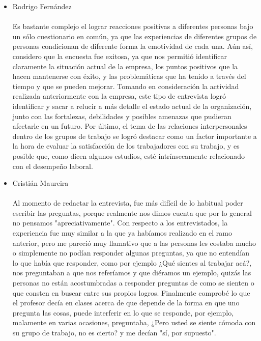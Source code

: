 
\begin{itemize}
	\item Rodrigo Fernández\\ \\
        Es bastante complejo el lograr reacciones positivas a diferentes
        personas bajo un sólo cuestionario en común, ya que las experiencias de
        diferentes grupos de personas condicionan de diferente forma la
        emotividad de cada una. Aún así, considero que la encuesta fue exitosa, ya
        que nos permitió identificar claramente la situación actual de la
        empresa, los puntos positivos que la hacen mantenerse con éxito, y las
        problemáticas que ha tenido a través del tiempo y que se pueden mejorar.
        Tomando en consideración la actividad realizada anteriormente con la
        empresa, este tipo de entrevista logró identificar y sacar a relucir a
        más detalle el estado actual de la organización, junto con las
        fortalezas, debilidades y posibles amenazas que pudieran afectarle en
        un futuro.
        Por último, el tema de las relaciones interpersonales dentro de los
        grupos de trabajo se logró destacar como un factor importante a la
        hora de evaluar la satisfacción de los trabajadores con su trabajo, y
        es posible que, como dicen algunos estudios, esté intrínsecamente
        relacionado con el desempeño laboral.
	\item Cristián Maureira \\ \\
		Al momento de redactar la entrevista, fue más difícil de lo habitual
	poder escribir las preguntas, porque realmente nos dimos cuenta que por lo
	general no pensamos "apreciativamente".
	Con respecto a los entrevistados, la experiencia fue muy similar a la que
	ya habíamos realizado en el ramo anterior, pero me pareció muy llamativo
	que a las personas les costaba mucho o simplemente no podían responder
	algunas preguntas, ya que no entendían lo que había que responder, como
	por ejemplo ¿Qué sientes al trabajar acá?, nos preguntaban a que nos
	referíamos y que diéramos un ejemplo, quizás las personas no están acostumbradas
	a responder preguntas de como se sienten o que consten en buscar entre sus
	propios logros.
	Finalmente comprobé lo que el profesor decía en clases acerca de que depende
	de la forma en que uno pregunta las cosas, puede interferir en lo que se responde,
	por ejemplo, malamente en varias ocasiones, preguntaba, ¿Pero usted se siente cómoda
	con su grupo de trabajo, no es cierto? y me decían "sí, por supuesto".


\end{itemize}
